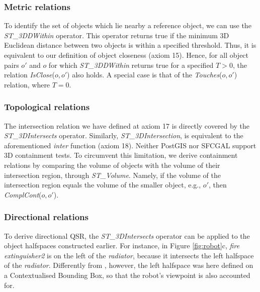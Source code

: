 \documentclass{article}
\begin{document}
\subsubsection{Metric relations} To identify the set of objects which lie nearby a reference object, we can use the \textit{ST\_3DDWithin} operator. This operator returns true if the minimum 3D Euclidean distance between two objects is within a specified threshold. Thus, it is equivalent to our definition of object closeness (axiom 15). Hence, for all object pairs $o'$ and $o$ for which \textit{ST\_3DDWithin} returns true for a specified $T>0$, the relation \textit{IsClose}($o,o'$) also holds. A special case is that of the \textit{Touches}($o,o'$) relation, where $T=0$.  %
\subsubsection{Topological relations} The intersection relation we have defined at axiom 17 is directly covered by the  \textit{ST\_3DIntersects} operator. Similarly, \textit{ST\_3DIntersection}, is equivalent to the aforementioned \textit{inter} function (axiom 18).  
Neither PostGIS nor SFCGAL support 3D containment tests. To circumvent this limitation, we derive containment relations by comparing the volume of objects with the volume of their intersection region, through \textit{ST\_Volume}. Namely, if the volume of the intersection region equals the volume of the smaller object, e.g., $o'$, then \textit{ComplCont}($o,o'$).   

\subsubsection{Directional relations} To derive directional QSR, the \textit{ST\_3DIntersects} operator can be applied to the object halfspaces constructed earlier. For instance, in Figure \ref{fig:robot}c, \textit{fire extinguisher2} is on the left of the \textit{radiator}, because it intersects the left halfspace of the \textit{radiator}. Differently from \cite{deeken_grounding_2018}, however, the left halfspace was here defined on a Contextualised Bounding Box, so that the robot's viewpoint is also accounted for.
\end{document}
